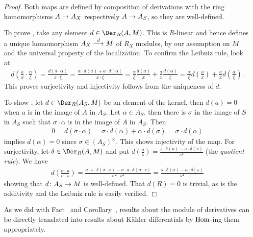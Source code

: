 \documentclass[a4paper,parskip=half,numbers=enddot, DIV=12]{scrreprt}
\begin{document}
\begin{proof}
    Both maps are defined by composition of derivations with the ring homomorphisms $A\morphism A_X$ respectively $A\morphism A_S$, so they are well-defined.
    
    To prove , take any element $d\in \Der_R(A,M)$. This is $R$-linear and hence defines a unique homomorphism $A_X\morphism[d] M$ of $R_X$ modules, by our assumption on $M$ and the universal property of the localization. To confirm the Leibniz rule, look at
    \begin{align*}
        d\left(\frac{a}{x}\cdot \frac{\alpha}{\xi}\right) = \frac{d(a\cdot\alpha)}{x\cdot \xi} = \frac{\alpha\cdot d(a) +a\cdot d(\alpha)}{x\cdot \xi} = \frac{\alpha}{\xi}\frac{d(a)}{x} +\frac{a}{x}\frac{d(\alpha)}{\xi} = \frac{\alpha}{\xi}d\left(\frac{a}{x}\right) +\frac{a}{x}d\left(\frac{\alpha}{\xi}\right).
    \end{align*}
    This proves surjectivity and injectivity follows from the uniqueness of $d$.
    
    To show , let $d\in\Der_R(A_S,M)$ be an element of the kernel, then $d(a)=0$ when $a$ is in the image of $A$ in $A_S$. Let $\alpha\in A_S$, then there is $\sigma$ in the image of $S$ in $A_S$ such that $\sigma\cdot \alpha$ is in the image of $A$ in $A_S$. Then 
    \begin{align*}
        0 = d(\sigma\cdot \alpha) = \sigma \cdot d(\alpha) + \alpha\cdot d(\sigma) = \sigma\cdot d(\alpha)
    \end{align*}
    implies $d(\alpha) = 0$ since $\sigma\in (A_S)^\times$. This shows injectivity of the map. For surjectivity, let $\delta\in \Der_R(A,M)$ and put $d\left(\frac{a}{s}\right) = \frac{s\cdot\delta(a) - a\cdot\delta(s)}{s^2}$ (the \emph{quotient rule}). We have
    \begin{align*}
        d\left(\frac{\sigma\cdot a}{\sigma \cdot s}\right) = \frac{\sigma\cdot s\cdot \delta(\sigma\cdot a) - \sigma \cdot a \cdot \delta(\sigma\cdot s)}{\sigma^2\cdot s^2} = \frac{s\cdot \delta(a)-a\cdot\delta(s)}{s^2}
    \end{align*}
    showing that $d\colon A_S\morphism M$ is well-defined. That $d(R)=0$ is trivial, as is the additivity and the Leibniz rule is easily verified.
\end{proof}
As we did with Fact~ and Corollary~, results about the module of derivatives can be directly translated into results about Kähler differentials by $\operatorname{Hom}$-ing them appropriately.
\end{document}

